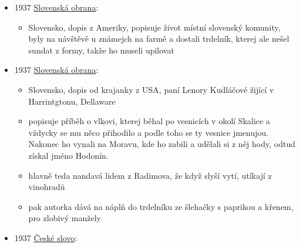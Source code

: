 \begin{itemize}
  \begin{itemize}
  \tightlist
  \item
    další článek o návštěvě Benešových v Luhačovicích
  \item
    choť nájemce Jahody darovala slovácké trdelníky, moučníkovou
    specialitu kraje
  \item
    takže už tam v tý době nebyli Jurkovičovi a trdelníky v Luhačovicích
    se neprezentovaly jako skalický?
  \end{itemize}
\item
  1937
  \href{http://digitalna.kniznica.info/zoom/90599/view?search=trdeln\%C3\%ADk\%20OR\%20trdeln\%C3\%ADka\%20OR\%20trdeln\%C3\%ADku&page=6&p=separate&tool=search&view=1502,2130,4778,2339}{Slovenská
  obrana}:

  \begin{itemize}
  \tightlist
  \item
    Slovensko, dopis z Ameriky, popisuje život místní slovenský
    komunity, byly na návštěvě u známejch na farmě a dostali trdelník,
    kterej ale nešel sundat z formy, takže ho museli upilovat
  \end{itemize}
\item
  1937
  \href{http://digitalna.kniznica.info/zoom/90688/view?search=trdeln\%C3\%ADk\%20OR\%20trdeln\%C3\%ADka\%20OR\%20trdeln\%C3\%ADku&page=6&p=separate&tool=search&view=2631,1599,4628,2266}{Slovenská
  obrana}:

  \begin{itemize}
  \tightlist
  \item
    Slovensko, dopis od krajanky z USA, paní Lenory Kudláčové žijící v
    Harrintgtonu, Dellaware
  \item
    popisuje příběh o vlkovi, kterej běhal po vesnicích v okolí Skalice
    a vždycky se mu něco přihodilo a podle toho se ty vesnice jmenujou.
    Nakonec ho vynali na Moravu, kde ho zabili a udělali si z něj hody,
    odtud získal jméno Hodonín.
  \item
    hlavně teda nandavá lidem z Radimova, že když slyší vytí, utíkají z
    vinohradů
  \item
    pak autorka dává  na náplň do trdelníku ze šlehačky
    s paprikou a křenem, pro zlobivý manžely
  \end{itemize}
\item
  1937
  \href{https://www.digitalniknihovna.cz/vkol/uuid/uuid:b42af96b-ef00-4cc8-ac42-7413f52b7595}{České
  slovo}:


\end{itemize}
